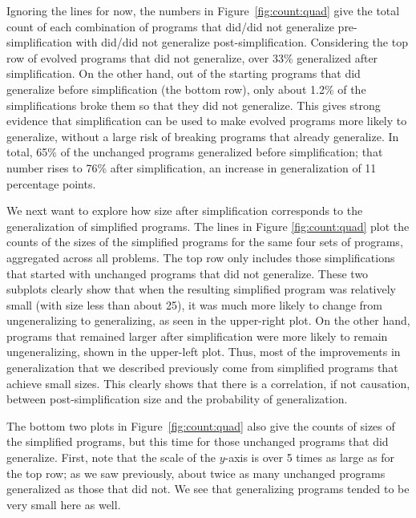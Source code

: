 Ignoring the lines for now, the numbers in Figure~\ref{fig:count:quad} give the total count of each combination of programs that did/did not generalize pre-simplification with  did/did not generalize post-simplification. Considering the top row of evolved programs that did not generalize, over 33\% generalized after simplification. On the other hand, out of the starting programs that did generalize before simplification (the bottom row), only about 1.2\% of the simplifications broke them so that they did not generalize. This gives strong evidence that simplification can be used to make evolved programs more likely to generalize, without a large risk of breaking programs that already generalize. In total, 65\% of the unchanged programs generalized before simplification; that number rises to 76\% after simplification, an increase in generalization of 11 percentage points.


We next want to explore how size after simplification corresponds to the generalization of simplified programs. The lines in Figure \ref{fig:count:quad} plot the counts of the sizes of the simplified programs for the same four sets of programs, aggregated across all problems. The top row only includes those simplifications that started with unchanged programs that did not generalize. These two subplots clearly show that when the resulting simplified program was relatively small (with size less than about 25), it was much more likely to change from ungeneralizing to generalizing, as seen in the upper-right plot. On the other hand, programs that remained larger after simplification were more likely to remain ungeneralizing, shown in the upper-left plot. Thus, most of the improvements in generalization that we described previously come from simplified programs that achieve small sizes. This clearly shows that there is a correlation, if not causation, between post-simplification size and the probability of generalization.

The bottom two plots in Figure~\ref{fig:count:quad} also give the counts of sizes of the simplified programs, but this time for those unchanged programs that did generalize. First, note that the scale of the $y$-axis is over 5 times as large as for the top row; as we saw previously, about twice as many unchanged programs generalized as those that did not. We see that generalizing programs tended to be very small here as well.


